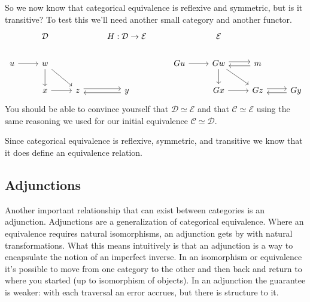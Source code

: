 \documentclass[12pt]{article}
\begin{document}
So we now know that categorical equivalence is reflexive and symmetric, but is it transitive?
To test this we'll need another small category and another functor.
\[\begin{tikzcd}
        & {\mathcal{D}} && {H:\mathcal{D}\rightarrow\mathcal{E}} && {\mathcal{E}} \\
        u & w &&& Gu & Gw & m \\
        & x & z & y && Gx & Gz & Gy
        \arrow[from=2-6, to=3-6]
        \arrow[from=2-1, to=2-2]
        \arrow[from=2-2, to=3-2]
        \arrow[from=3-2, to=3-3]
        \arrow[from=2-2, to=3-3]
        \arrow[shift left, from=3-3, to=3-4]
        \arrow[shift left, from=3-4, to=3-3]
        \arrow[from=2-6, to=3-7]
        \arrow[from=3-6, to=3-7]
        \arrow[from=2-5, to=2-6]
        \arrow[shift left, from=2-6, to=2-7]
        \arrow[shift left, from=2-7, to=2-6]
        \arrow[shift left, from=3-7, to=3-8]
        \arrow[shift left, from=3-8, to=3-7]
    \end{tikzcd}\]
You should be able to convince yourself that $\mathcal{D}\simeq\mathcal{E}$ and that $\mathcal{C}\simeq\mathcal{E}$ using the same reasoning we used for our initial equivalence $\mathcal{C}\simeq\mathcal{D}$.

Since categorical equivalence is reflexive, symmetric, and transitive we know that it does define an equivalence relation.



\subsection*{Adjunctions}
Another important relationship that can exist between categories is an adjunction.
Adjunctions are a generalization of categorical equivalence.
Where an equivalence requires natural isomorphisms, an adjunction gets by with natural transformations.
What this means intuitively is that an adjunction is a way to encapsulate the notion of an imperfect inverse.
In an isomorphism or equivalence it's possible to move from one category to the other and then back and return to where you started (up to isomorphism of objects).
In an adjunction the guarantee is weaker: with each traversal an error accrues, but there is structure to it.
\end{document}
